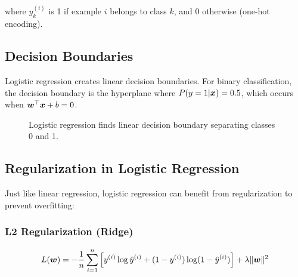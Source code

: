 where $y_k^{(i)}$ is 1 if example $i$ belongs to class $k$, and 0 otherwise (one-hot encoding).

\subsection{Decision Boundaries}

Logistic regression creates linear decision boundaries. For binary classification, the decision boundary is the hyperplane where $P(y=1|\boldsymbol{x}) = 0.5$, which occurs when $\boldsymbol{w}^\top \boldsymbol{x} + b = 0$.

\begin{figure}[htbp]
\centering
{}
\caption{Logistic regression finds linear decision boundary separating classes 0 and 1.}
\label{fig:logistic-decision-boundary}
\end{figure}

\subsection{Regularization in Logistic Regression}

Just like linear regression, logistic regression can benefit from regularization to prevent overfitting:

\subsubsection{L2 Regularization (Ridge)}

\begin{equation}
L(\boldsymbol{w}) = -\frac{1}{n} \sum_{i=1}^{n} \left[y^{(i)} \log \hat{y}^{(i)} + (1-y^{(i)}) \log(1-\hat{y}^{(i)})\right] + \lambda \|\boldsymbol{w}\|^2
\end{equation}

